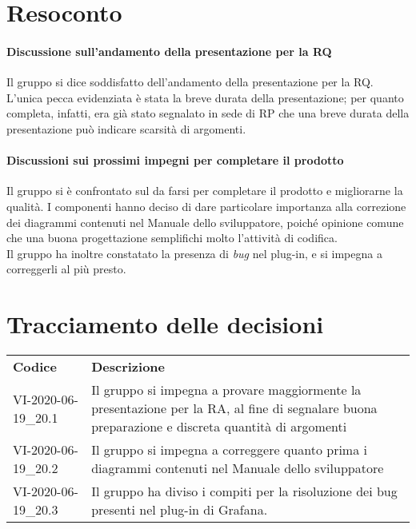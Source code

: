 \documentclass{article}
\begin{document}
\section{Resoconto}%
\label{resoconto}
\paragraph*{Discussione sull'andamento della presentazione per la RQ}
Il gruppo si dice soddisfatto dell'andamento della presentazione per la RQ. L'unica pecca evidenziata è stata la breve durata della presentazione; per quanto 
completa, infatti, era già stato segnalato in sede di RP che una breve durata della presentazione può indicare scarsità di argomenti.

\paragraph*{Discussioni sui prossimi impegni per completare il prodotto}
Il gruppo si è confrontato sul da farsi per completare il prodotto e migliorarne la qualità. I componenti hanno deciso di dare particolare importanza alla correzione 
dei diagrammi contenuti nel Manuale dello sviluppatore, poiché opinione comune che una buona progettazione semplifichi molto l'attività di codifica. \\
Il gruppo ha inoltre constatato la presenza di \textit{bug} nel plug-in, e si impegna a correggerli al più presto.

\section{Tracciamento delle decisioni}
\begin{table}[H]
  \centering
  \begin{tabular}{p{4cm}|p{12cm}}
    \rowcolor{lightgray}
    \textbf{Codice}  & \textbf{Descrizione}      \\
    VI-2020-06-19\_20.1 & Il gruppo si impegna a provare maggiormente la presentazione per la RA, al fine di segnalare buona preparazione e discreta quantità di argomenti \\
    VI-2020-06-19\_20.2 & Il gruppo si impegna a correggere quanto prima i diagrammi contenuti nel Manuale dello sviluppatore \\
    VI-2020-06-19\_20.3 & Il gruppo ha diviso i compiti per la risoluzione dei bug presenti nel plug-in di Grafana.
  \end{tabular}
\end{table}
\end{document}
